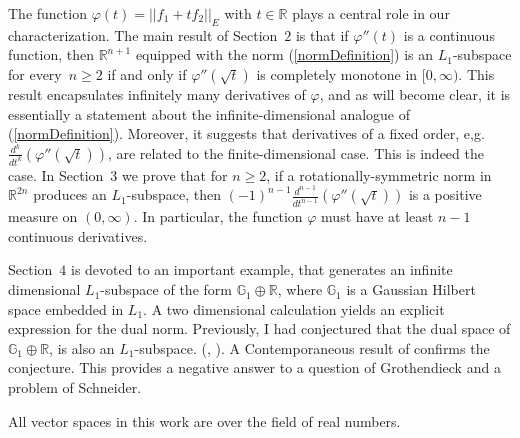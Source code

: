 \documentclass{article}[1100]
\theoremstyle{definition}
\theoremstyle{remark}
\newcommand\Ren[1]{\mathbb{R}^{#1}}
\newcommand\ar{\mathbb{R}}
\newcommand\norma[1]{|\!|#1|\!|}
\begin{document}
\medskip

The function $\varphi(t)=\norma{f_1+tf_2}_{\scriptstyle{E}}$ with $t\in\ar$ plays a central role
in our characterization.  The main result of Section~$2$ is that if $\varphi''(t)$ is a continuous function, then  $\Ren{n+1}$
equipped with the norm (\ref{normDefinition})  is an $L_1$-subspace for every~$n\geq 2$ if and only if $\varphi''(\sqrt{t})$ is completely monotone in $[0,\infty)$. This result encapsulates  infinitely many derivatives of $\varphi$, and as will become clear, it is
 essentially a statement about the infinite-dimensional analogue of (\ref{normDefinition}). Moreover, it suggests that  derivatives of a fixed order, e,g. $\frac{d^k}{dt^k}(\varphi''(\sqrt{t}))$,
are related to the finite-dimensional case. This is indeed the case. In Section~$3$ we prove that for $n\geq 2$,  if a rotationally-symmetric norm in $\Ren{2n}$
produces an $L_1$-subspace, then $(-1)^{n-1}\frac{d^{n-1}}{dt^{n-1}}(\varphi''(\sqrt{t}))$ is a positive measure on $(0,\infty)$. In particular, the function $\varphi$ must have at least $n-1$ continuous derivatives.

 \medskip

Section~$4$ is devoted to an important example, that generates an infinite dimensional $L_1$-subspace of the form 
$\mathbb{G}_1\oplus \ar$, where $\mathbb{G}_1$ is a Gaussian Hilbert space embedded in $L_1$. A two dimensional calculation yields
an explicit expression for the dual norm.  Previously, I had conjectured that the dual space of $\mathbb{G}_1\oplus \ar$, is also an $L_1$-subspace. (\cite{KoldobskyPrivate}, \cite{SchneiderPrivate}).
A Contemporaneous  result of  \cite{RyaZvav}  confirms the conjecture. This provides a negative answer to a question of Grothendieck and a problem of Schneider.  
\medskip

\medskip

All vector spaces in this work are over the field of real numbers. 
\end{document}
